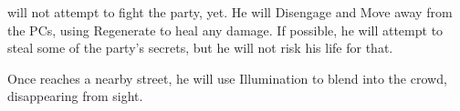 
\npcBlindBeggar{} will not attempt to fight the party, yet. He will Disengage and Move away from the PCs, using Regenerate to heal any damage. If possible, he will attempt to steal some of the party's secrets, but he will not risk his life for that.

Once \npcBlindBeggar{} reaches a nearby street, he will use Illumination to blend into the crowd, disappearing from sight.

